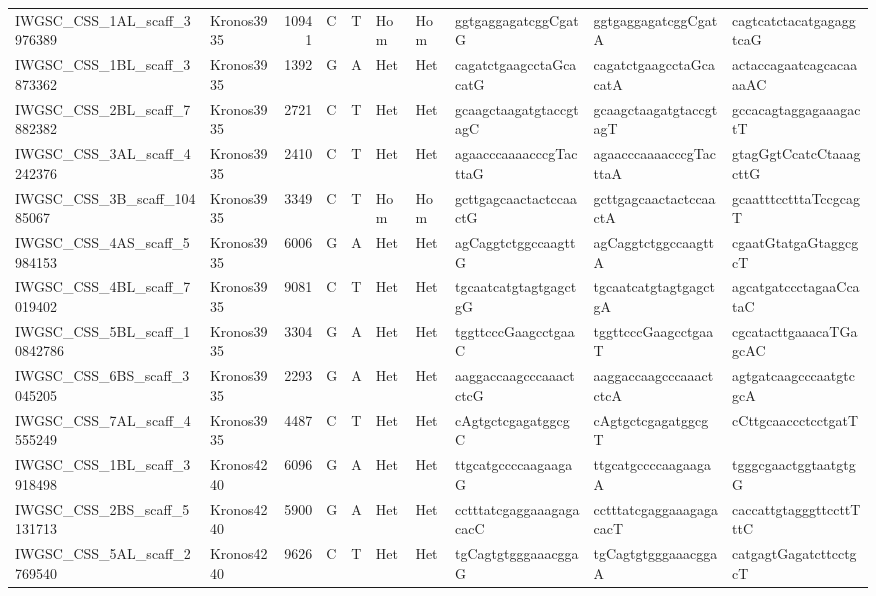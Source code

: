 \begin{tabular}{llrlllllll}
 IWGSC\_CSS\_1AL\_scaff\_3976389  & Kronos3935 & 10941 & C    & T     & Hom    & Hom   & ggtgaggagatcggCgatG      & ggtgaggagatcggCgatA      & cagtcatctacatgagaggtcaG  \\
 IWGSC\_CSS\_1BL\_scaff\_3873362  & Kronos3935 &  1392 & G    & A     & Het    & Het   & cagatctgaagcctaGcacatG   & cagatctgaagcctaGcacatA   & actaccagaatcagcacaaaaAC  \\
 IWGSC\_CSS\_2BL\_scaff\_7882382  & Kronos3935 &  2721 & C    & T     & Het    & Het   & gcaagctaagatgtaccgtagC   & gcaagctaagatgtaccgtagT   & gccacagtaggagaaagactT    \\
 IWGSC\_CSS\_3AL\_scaff\_4242376  & Kronos3935 &  2410 & C    & T     & Het    & Het   & agaacccaaaacccgTacttaG   & agaacccaaaacccgTacttaA   & gtagGgtCcatcCtaaagcttG   \\
 IWGSC\_CSS\_3B\_scaff\_10485067  & Kronos3935 &  3349 & C    & T     & Hom    & Hom   & gcttgagcaactactccaactG   & gcttgagcaactactccaactA   & gcaatttcctttaTccgcagT    \\
 IWGSC\_CSS\_4AS\_scaff\_5984153  & Kronos3935 &  6006 & G    & A     & Het    & Het   & agCaggtctggccaagttG      & agCaggtctggccaagttA      & cgaatGtatgaGtaggcgcT     \\
 IWGSC\_CSS\_4BL\_scaff\_7019402  & Kronos3935 &  9081 & C    & T     & Het    & Het   & tgcaatcatgtagtgagctgG    & tgcaatcatgtagtgagctgA    & agcatgatccctagaaCcataC   \\
 IWGSC\_CSS\_5BL\_scaff\_10842786 & Kronos3935 &  3304 & G    & A     & Het    & Het   & tggttcccGaagcctgaaC      & tggttcccGaagcctgaaT      & cgcatacttgaaacaTGagcAC   \\
 IWGSC\_CSS\_6BS\_scaff\_3045205  & Kronos3935 &  2293 & G    & A     & Het    & Het   & aaggaccaagcccaaactctcG   & aaggaccaagcccaaactctcA   & agtgatcaagcccaatgtcgcA   \\
 IWGSC\_CSS\_7AL\_scaff\_4555249  & Kronos3935 &  4487 & C    & T     & Het    & Het   & cAgtgctcgagatggcgC       & cAgtgctcgagatggcgT       & cCttgcaaccctcctgatT      \\
 IWGSC\_CSS\_1BL\_scaff\_3918498  & Kronos4240 &  6096 & G    & A     & Het    & Het   & ttgcatgccccaagaagaG      & ttgcatgccccaagaagaA      & tgggcgaactggtaatgtgG     \\
 IWGSC\_CSS\_2BS\_scaff\_5131713  & Kronos4240 &  5900 & G    & A     & Het    & Het   & cctttatcgaggaaagagacacC  & cctttatcgaggaaagagacacT  & caccattgtagggttccttTttC  \\
 IWGSC\_CSS\_5AL\_scaff\_2769540  & Kronos4240 &  9626 & C    & T     & Het    & Het   & tgCagtgtgggaaacggaG      & tgCagtgtgggaaacggaA      & catgagtGagatcttcctgcT    \\

\end{tabular}
